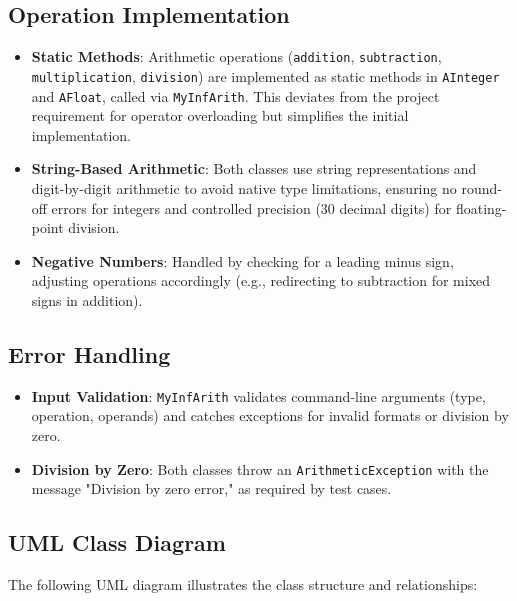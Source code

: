\documentclass[12pt]{article}
\begin{document}
\subsection{Operation Implementation}
\begin{itemize}
    \item \textbf{Static Methods}: Arithmetic operations (\texttt{addition}, \texttt{subtraction}, \texttt{multiplication}, \texttt{division}) are implemented as static methods in \texttt{AInteger} and \texttt{AFloat}, called via \texttt{MyInfArith}. This deviates from the project requirement for operator overloading but simplifies the initial implementation.
    \item \textbf{String-Based Arithmetic}: Both classes use string representations and digit-by-digit arithmetic to avoid native type limitations, ensuring no round-off errors for integers and controlled precision (30 decimal digits) for floating-point division.
    \item \textbf{Negative Numbers}: Handled by checking for a leading minus sign, adjusting operations accordingly (e.g., redirecting to subtraction for mixed signs in addition).
\end{itemize}

\subsection{Error Handling}
\begin{itemize}
    \item \textbf{Input Validation}: \texttt{MyInfArith} validates command-line arguments (type, operation, operands) and catches exceptions for invalid formats or division by zero.
    \item \textbf{Division by Zero}: Both classes throw an \texttt{ArithmeticException} with the message "Division by zero error," as required by test cases.
\end{itemize}

\subsection{UML Class Diagram}
The following UML diagram illustrates the class structure and relationships:
\end{document}
